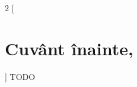 \thispagestyle{empty}
\begin{multicols}{2}
[
\section*{Cuvânt înainte,}
]
\footnotesize {
TODO
}
\end{multicols}

\vspace{1cm}

\begin{center}
\end{center}

\restoregeometry